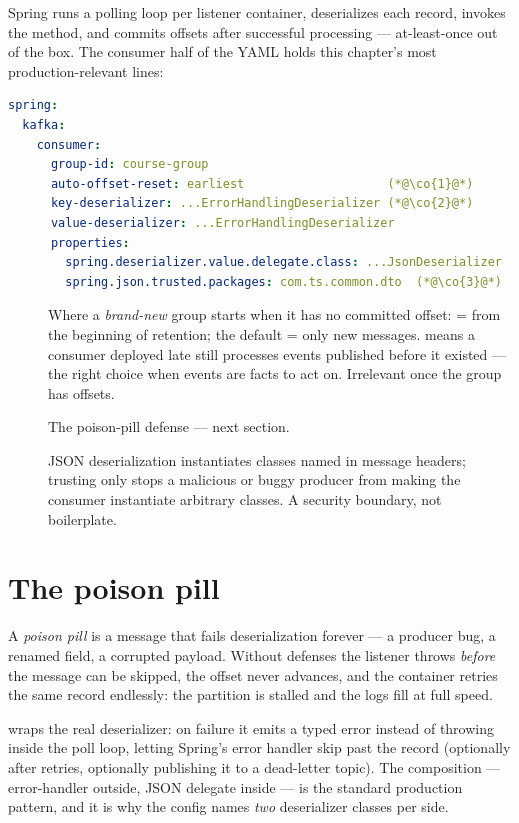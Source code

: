 Spring runs a polling loop per listener container, deserializes each
record, invokes the method, and commits offsets after successful
processing --- at-least-once out of the box. The consumer half of the
YAML holds this chapter's most production-relevant lines:

\begin{lstlisting}[language=yaml]
spring:
  kafka:
    consumer:
      group-id: course-group
      auto-offset-reset: earliest                    (*@\co{1}@*)
      key-deserializer: ...ErrorHandlingDeserializer (*@\co{2}@*)
      value-deserializer: ...ErrorHandlingDeserializer
      properties:
        spring.deserializer.value.delegate.class: ...JsonDeserializer
        spring.json.trusted.packages: com.ts.common.dto  (*@\co{3}@*)
\end{lstlisting}

\begin{description}
  \item[] Where a \emph{brand-new} group starts when it has no
  committed offset:  = from the beginning of retention;
  the default  = only new messages.  means a
  consumer deployed late still processes events published before it
  existed --- the right choice when events are facts to act on.
  Irrelevant once the group has offsets.
  \item[] The poison-pill defense --- next section.
  \item[] JSON deserialization instantiates classes named in
  message headers; trusting only  stops a
  malicious or buggy producer from making the consumer instantiate
  arbitrary classes. A security boundary, not boilerplate.
\end{description}

\section{The poison pill}

A \emph{poison pill} is a message that fails deserialization forever ---
a producer bug, a renamed field, a corrupted payload. Without defenses
the listener throws \emph{before} the message can be skipped, the offset
never advances, and the container retries the same record endlessly:
the partition is stalled and the logs fill at full speed.

 wraps the real deserializer: on
failure it emits a typed error instead of throwing inside the poll loop,
letting Spring's error handler skip past the record (optionally after
retries, optionally publishing it to a dead-letter topic). The
composition --- error-handler outside, JSON delegate inside --- is the
standard production pattern, and it is why the config names \emph{two}
deserializer classes per side.

